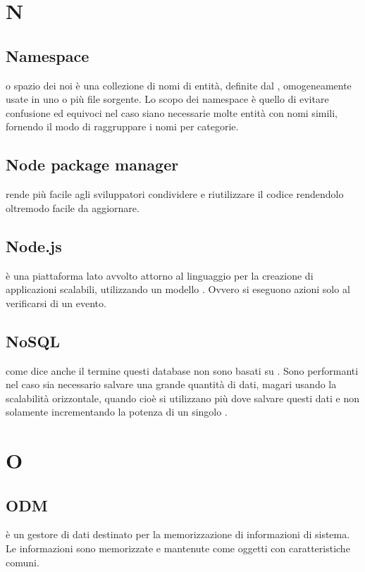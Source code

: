 \documentclass[12pt,a4paper]{article}
\begin{document}
\newpage

\section{N}

\subsection{Namespace} 
 o spazio dei noi è una collezione di nomi di entità, definite dal , omogeneamente usate in uno o più file sorgente. Lo scopo dei namespace è quello di evitare confusione ed equivoci nel caso siano necessarie molte entità con nomi simili, fornendo il modo di raggruppare i nomi per categorie.

\subsection{Node package manager} 
 rende più facile agli sviluppatori  condividere e riutilizzare il codice rendendolo oltremodo facile da aggiornare.

\subsection{Node.js} 
 è una piattaforma lato  avvolto attorno al linguaggio  per la creazione di applicazioni scalabili, utilizzando un modello . Ovvero si eseguono azioni solo al verificarsi di un evento.

\subsection{NoSQL} 
 come dice anche il termine questi database non sono basati su . Sono performanti nel caso sia necessario salvare una grande quantità di dati, magari usando la scalabilità orizzontale, quando cioè si utilizzano più  dove salvare questi dati e non solamente incrementando la potenza di un singolo .


\newpage

\section{O}

\subsection{ODM} 
è un gestore di dati destinato per la memorizzazione di informazioni di sistema. Le informazioni sono memorizzate e mantenute come oggetti con caratteristiche comuni.
\end{document}
